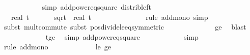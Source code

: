 \begin{isabellebody}
\ \ \ \ \ \ \ \ \ \ \isamarkupfalse%
\ {\isacharparenleft}{\kern0pt}simp\ add{\isacharcolon}{\kern0pt}power{}{\isacharunderscore}{\kern0pt}eq{\isacharunderscore}{\kern0pt}square\ distrib{\isacharunderscore}{\kern0pt}left{\isacharparenright}{\kern0pt}\isanewline
\ \ \ \ \ \ \ \ \isamarkupfalse%
\ \isamarkupfalse%
\ {\isachardoublequoteopen}{\isachardot}{\kern0pt}{\isachardot}{\kern0pt}{\isachardot}{\kern0pt}\ {\isasymle}\ real\ t\ {\isacharminus}{\kern0pt}\ {}{}{\isacharslash}{\kern0pt}\ {\isasymdelta}{\isacharprime}{\kern0pt}\ {\isacharplus}{\kern0pt}\ {}\ {\isacharasterisk}{\kern0pt}\ sqrt\ {\isacharparenleft}{\kern0pt}\ real\ t\ \ {\isacharplus}{\kern0pt}\ {}{\isacharparenright}{\kern0pt}{\isachardoublequoteclose}\isanewline
\ \ \ \ \ \ \ \ \ \ \isamarkupfalse%
\ {\isacharparenleft}{\kern0pt}rule\ add{\isacharunderscore}{\kern0pt}mono{\isacharcomma}{\kern0pt}\ simp{\isacharparenright}{\kern0pt}\isanewline
\ \ \ \ \ \ \ \ \ \ \ \isamarkupfalse%
\ {\isacharparenleft}{\kern0pt}subst\ mult{\isachardot}{\kern0pt}commute{\isacharcomma}{\kern0pt}\ subst\ pos{\isacharunderscore}{\kern0pt}divide{\isacharunderscore}{\kern0pt}le{\isacharunderscore}{\kern0pt}eq{\isacharbrackleft}{\kern0pt}symmetric{\isacharbrackright}{\kern0pt}{\isacharparenright}{\kern0pt}\isanewline
\ \ \ \ \ \ \ \ \ \ \ \ \isamarkupfalse%
\ {\isasymdelta}{\isacharprime}{\kern0pt}{\isacharunderscore}{\kern0pt}ge{\isacharunderscore}{\kern0pt}{}\ \isamarkupfalse%
\ blast\isanewline
\ \ \ \ \ \ \ \ \ \ \ \isamarkupfalse%
\ t{\isacharunderscore}{\kern0pt}ge{\isacharunderscore}{\kern0pt}{\isasymdelta}{\isacharprime}{\kern0pt}\ \isamarkupfalse%
\ {\isacharparenleft}{\kern0pt}simp\ add{\isacharcolon}{\kern0pt}power{}{\isacharunderscore}{\kern0pt}eq{\isacharunderscore}{\kern0pt}square{\isacharparenright}{\kern0pt}\isanewline
\ \ \ \ \ \ \ \ \ \ \isamarkupfalse%
\ simp\isanewline
\ \ \ \ \ \ \ \ \ \ \isamarkupfalse%
\ {\isacharparenleft}{\kern0pt}rule\ add{\isacharunderscore}{\kern0pt}mono{\isacharparenright}{\kern0pt}\isanewline
\ \ \ \ \ \ \ \ \ \ \ \isamarkupfalse%
\ {\isasymdelta}{\isacharprime}{\kern0pt}{\isacharunderscore}{\kern0pt}le{\isacharunderscore}{\kern0pt}{}\ {\isasymdelta}{\isacharprime}{\kern0pt}{\isacharunderscore}{\kern0pt}ge{\isacharunderscore}{\kern0pt}{}\ \isamarkupfalse%

\end{isabellebody}
